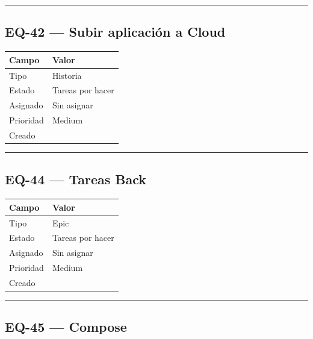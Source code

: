\documentclass[
  spanish,
  11pt,
]{report}
\newcounter{none} %
\begin{document}
\begin{center}\rule{0.5\linewidth}{0.5pt}\end{center}

\subsection{EQ-42 --- Subir aplicación a
Cloud}\label{eq-42-subir-aplicaciuxf3n-a-cloud}

{\def\LTcaptype{none} %
\begin{longtable}[]{@{}ll@{}}
\toprule\noalign{}
Campo & Valor \\
\midrule\noalign{}
\endhead
\bottomrule\noalign{}
\endlastfoot
Tipo & Historia \\
Estado & Tareas por hacer \\
Asignado & Sin asignar \\
Prioridad & Medium \\
Creado & \\
\end{longtable}
}

\begin{center}\rule{0.5\linewidth}{0.5pt}\end{center}

\subsection{EQ-44 --- Tareas Back}\label{eq-44-tareas-back}

{\def\LTcaptype{none} %
\begin{longtable}[]{@{}ll@{}}
\toprule\noalign{}
Campo & Valor \\
\midrule\noalign{}
\endhead
\bottomrule\noalign{}
\endlastfoot
Tipo & Epic \\
Estado & Tareas por hacer \\
Asignado & Sin asignar \\
Prioridad & Medium \\
Creado & \\
\end{longtable}
}

\begin{center}\rule{0.5\linewidth}{0.5pt}\end{center}

\subsection{EQ-45 --- Compose}\label{eq-45-compose}
\end{document}
